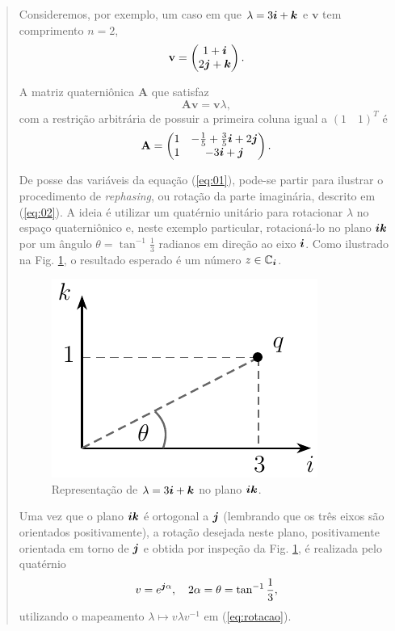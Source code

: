 \begin{quotation}
\begin{example}
	\upshape
	Consideremos, por exemplo, um caso em que $ \lambda = 3\boldsymbol{i} + \boldsymbol{k} $ e $ \mathbf{v} $ tem comprimento $ n=2 $,
	\begin{equation}
	\mathbf{v} =\begin{pmatrix}
	1 +  \boldsymbol{i}\\
	2 \boldsymbol{j} + \boldsymbol{k}
	\end{pmatrix}.
	\end{equation}
	
	A matriz quaterni\^onica $ \mathbf{A} $ que satisfaz
	\begin{equation}
	\label{eq:03}
	\mathbf{A} \mathbf{v} = \mathbf{v} \lambda,
	\end{equation}
	com a restri\c c\~ao arbitr\'aria de possuir a primeira coluna igual a $ (1 \quad 1)^T $ \'e
	\begin{equation}
	\mathbf{A} =
	\begin{pmatrix}
	1 & - \frac{1}{5} + \frac{3}{5} \boldsymbol{i} + 2 \boldsymbol{j} \\
	1 & -3 \boldsymbol{i} + \boldsymbol{j}
	\end{pmatrix}.
	\end{equation}
	
	De posse das vari\'aveis da equa\c c\~ao (\ref{eq:01}), pode-se partir para ilustrar o procedimento de \emph{rephasing}, ou rota\c c\~ao da parte imagin\'aria, descrito em (\ref{eq:02}). A ideia \'e utilizar um quat\'ernio unit\'ario para rotacionar $ \lambda $ no espa\c co quaterni\^onico e, neste exemplo particular, rotacion\'a-lo no plano $ \boldsymbol{i} \boldsymbol{k} $ por um \^angulo $ \theta = \tan^{-1} \frac{1}{3} $ radianos em dire\c c\~ao ao eixo $ \boldsymbol{i} $. Como ilustrado na Fig. \ref{fig:quat3ik}, o resultado esperado \'e um n\'umero $ z \in \mathbb{C}_{\boldsymbol{i}} $.
	
	
	\begin{figure}
		\centering
		\includegraphics[width=0.3\linewidth]{Figures/quaternion01.pdf}
		\caption{Representa\c c\~ao de $ \lambda = 3\boldsymbol{i} + \boldsymbol{k} $ no plano $ \boldsymbol{i} \boldsymbol{k} $.}
		\label{fig:quat3ik}
	\end{figure}
	
	Uma vez que o plano $ \boldsymbol{i} \boldsymbol{k} $ \'e ortogonal a $ \boldsymbol{j} $ (lembrando que os tr\^es eixos s\~ao orientados positivamente), a rota\c c\~ao desejada neste plano, positivamente orientada em torno de $ \boldsymbol{j} $ e obtida por inspe\c c\~ao da Fig. \ref{fig:quat3ik}, \'e realizada pelo quat\'ernio
	\begin{equation}
	\label{eq:04}
	v = e^{\boldsymbol{j} \alpha}, \quad 2\alpha = \theta = \tan^{-1} \frac{1}{3},
	\end{equation}
	utilizando o mapeamento $ \lambda \mapsto v \lambda v^{-1} $ em (\ref{eq:rotacao}).
	

\end{example}
\end{quotation}
